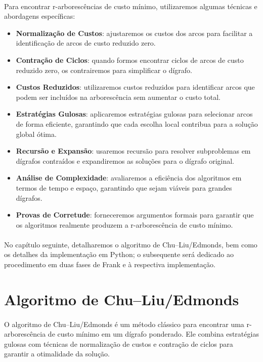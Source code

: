 \documentclass[12pt,a4paper]{article}
\begin{document}
\paragraph{}
Para encontrar r-arborescências de custo mínimo, utilizaremos algumas técnicas e abordagens específicas:
\begin{itemize}\setlength{\itemsep}{2pt}
    \item \textbf{Normalização de Custos}: ajustaremos os custos dos arcos para facilitar a identificação de arcos de custo reduzido zero.
    \item \textbf{Contração de Ciclos}: quando formos encontrar ciclos de arcos de custo reduzido zero, os contrairemos para simplificar o dígrafo.
    \item \textbf{Custos Reduzidos}: utilizaremos custos reduzidos para identificar arcos que podem ser incluídos na arborescência sem aumentar o custo total.
    \item \textbf{Estratégias Gulosas}: aplicaremos estratégias gulosas para selecionar arcos de forma eficiente, garantindo que cada escolha local contribua para a solução global ótima.
    \item \textbf{Recursão e Expansão}: usaremos recursão para resolver subproblemas em dígrafos contraídos e expandiremos as soluções para o dígrafo original.
    \item \textbf{Análise de Complexidade}: avaliaremos a eficiência dos algoritmos em termos de tempo e espaço, garantindo que sejam viáveis para grandes dígrafos.
    \item \textbf{Provas de Corretude}: forneceremos argumentos formais para garantir que os algoritmos realmente produzem a r-arborescência de custo mínimo.
\end{itemize}

\paragraph{}
No capítulo seguinte, detalharemos o algoritmo de Chu–Liu/Edmonds, bem como os detalhes da implementação em Python; o subsequente será dedicado ao procedimento em duas fases de Frank e à respectiva implementação.

\section{Algoritmo de Chu–Liu/Edmonds}

\paragraph{}
O algoritmo de Chu–Liu/Edmonds é um método clássico para encontrar uma r-arborescência de custo mínimo em um dígrafo ponderado. Ele combina estratégias gulosas com técnicas de normalização de custos e contração de ciclos para garantir a otimalidade da solução.
\end{document}

